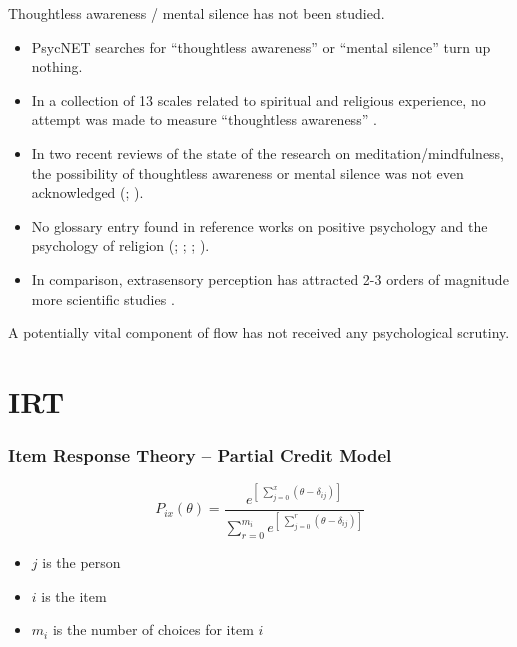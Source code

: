 \documentclass[10pt,utf8x]{beamer}
\begin{document}
\begin{frame}
Thoughtless awareness / mental silence has not been studied.

\begin{itemize}
\item PsycNET searches for ``thoughtless awareness'' or ``mental silence''
turn up nothing.
\item
In a collection of 13 scales related to spiritual and religious experience,
no attempt was made to measure ``thoughtless awareness'' \cite{fetzer1999}.
\item
In two recent reviews of the state of the research on meditation/mindfulness,
the possibility of thoughtless awareness or mental silence was not
even acknowledged (; ).
\item
No glossary entry found in reference works on
positive psychology and the psychology of religion
(; ; ; ).
\item In comparison, extrasensory perception has attracted 2-3 orders of
magnitude more scientific studies \cite{lau2004}.
\end{itemize}

A potentially vital component of flow has not received
 any psychological scrutiny.
\end{frame}

\section{IRT}
\begin{frame}
  \frametitle{Item Response Theory -- Partial Credit Model}

\begin{displaymath}
P_{ix}(\theta) =
\frac{e^{\left[\ \displaystyle\sum_{j=0}^{x} (\theta - \delta_{ij})\right]}}
{\displaystyle\sum_{r=0}^{m_i}
e^{\left[\ \displaystyle\sum_{j=0}^{r}(\theta - \delta_{ij})\right]}}
\end{displaymath}

\begin{itemize}
\item $j$ is the person
\item $i$ is the item
\item $m_i$ is the number of choices for item $i$
\end{itemize}
\end{frame}
\end{document}

